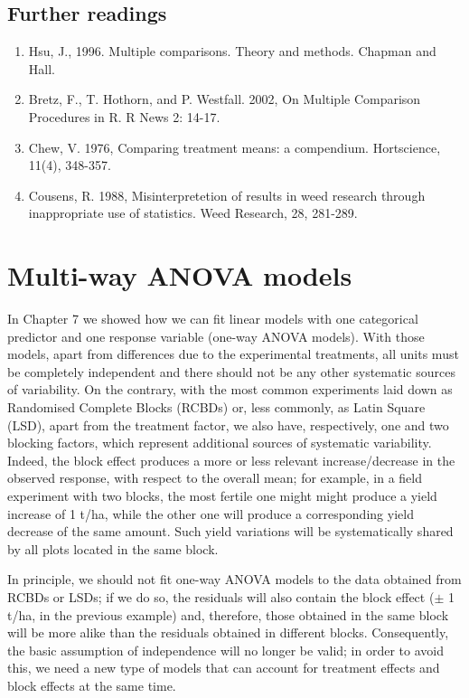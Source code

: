 \documentclass[a4paper,12pt,oneside]{book}
\providecommand{\tightlist}{%
  \setlength{\itemsep}{0pt}\setlength{\parskip}{0pt}}
\begin{document}
\hypertarget{further-readings-7}{%
\section{Further readings}\label{further-readings-7}}

\begin{enumerate}
\def\labelenumi{\arabic{enumi}.}
\tightlist
\item
  Hsu, J., 1996. Multiple comparisons. Theory and methods. Chapman and Hall.
\item
  Bretz, F., T. Hothorn, and P. Westfall. 2002, On Multiple Comparison Procedures in R. R News 2: 14-17.
\item
  Chew, V. 1976, Comparing treatment means: a compendium. Hortscience, 11(4), 348-357.
\item
  Cousens, R. 1988, Misinterpretetion of results in weed research through inappropriate use of statistics. Weed Research, 28, 281-289.
\end{enumerate}

\hypertarget{multi-way-anova-models}{%
\chapter{Multi-way ANOVA models}\label{multi-way-anova-models}}

In Chapter 7 we showed how we can fit linear models with one categorical predictor and one response variable (one-way ANOVA models). With those models, apart from differences due to the experimental treatments, all units must be completely independent and there should not be any other systematic sources of variability. On the contrary, with the most common experiments laid down as Randomised Complete Blocks (RCBDs) or, less commonly, as Latin Square (LSD), apart from the treatment factor, we also have, respectively, one and two blocking factors, which represent additional sources of systematic variability. Indeed, the block effect produces a more or less relevant increase/decrease in the observed response, with respect to the overall mean; for example, in a field experiment with two blocks, the most fertile one might might produce a yield increase of 1 t/ha, while the other one will produce a corresponding yield decrease of the same amount. Such yield variations will be systematically shared by all plots located in the same block.

In principle, we should not fit one-way ANOVA models to the data obtained from RCBDs or LSDs; if we do so, the residuals will also contain the block effect (\(\pm\) 1 t/ha, in the previous example) and, therefore, those obtained in the same block will be more alike than the residuals obtained in different blocks. Consequently, the basic assumption of independence will no longer be valid; in order to avoid this, we need a new type of models that can account for treatment effects and block effects at the same time.
\end{document}
